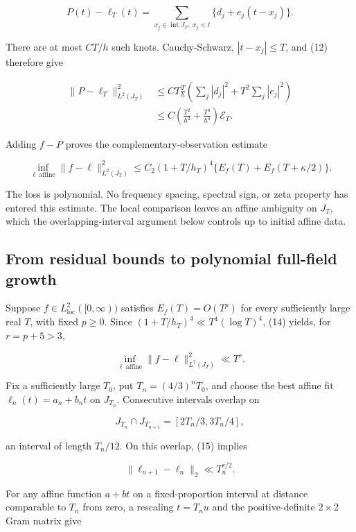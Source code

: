 \documentclass[
  11pt,
]{article}
\begin{document}
\[
P(t)-\ell_T(t)
=\sum_{x_j\in\operatorname{int}J_T,\ x_j<t}\{d_j+e_j(t-x_j)\}. \tag{13}
\]

There are at most \(C T/h\) such knots. Cauchy-Schwarz,
\(|t-x_j|\le T\), and (12) therefore give

\[
\begin{aligned}
\|P-\ell_T\|_{L^2(J_T)}^2
&\le C T\frac{T}{h}
\left(\sum_j|d_j|^2+T^2\sum_j|e_j|^2\right)\\
&\le C\left(\frac{T^2}{h^2}+\frac{T^4}{h^4}\right)\mathcal E_T.
\end{aligned}
\]

Adding \(f-P\) proves the complementary-observation estimate

\[
\boxed{
\inf_{\ell\ \mathrm{affine}}
\|f-\ell\|_{L^2(J_T)}^2
\le C_2(1+T/h_T)^4
\{E_f(T)+E_f(T+\kappa/2)\}.
} \tag{14}
\]

The loss is polynomial. No frequency spacing, spectral sign, or zeta
property has entered this estimate. The local comparison leaves an
affine ambiguity on \(J_T\), which the overlapping-interval argument
below controls up to initial affine data.

\hypertarget{from-residual-bounds-to-polynomial-full-field-growth}{%
\subsection{From residual bounds to polynomial full-field
growth}\label{from-residual-bounds-to-polynomial-full-field-growth}}

Suppose \(f\in L^2_{\mathrm{loc}}([0,\infty))\) satisfies
\(E_f(T)=O(T^p)\) for every sufficiently large real \(T\), with fixed
\(p\ge0\). Since \((1+T/h_T)^4\ll T^4(\log T)^4\), (14) yields, for
\(r=p+5>3\),

\[
\inf_{\ell\ \mathrm{affine}}
\|f-\ell\|_{L^2(J_T)}^2\ll T^r. \tag{15}
\]

Fix a sufficiently large \(T_0\), put \(T_n=(4/3)^nT_0\), and choose the
best affine fit \(\ell_n(t)=a_n+b_nt\) on \(J_{T_n}\). Consecutive
intervals overlap on

\[
J_{T_n}\cap J_{T_{n+1}}
=[2T_n/3,3T_n/4],
\]

an interval of length \(T_n/12\). On this overlap, (15) implies

\[
\|\ell_{n+1}-\ell_n\|_2\ll T_n^{r/2}. \tag{16}
\]

For any affine function \(a+bt\) on a fixed-proportion interval at
distance comparable to \(T_n\) from zero, a rescaling \(t=T_nu\) and the
positive-definite \(2\times2\) Gram matrix give
\end{document}
